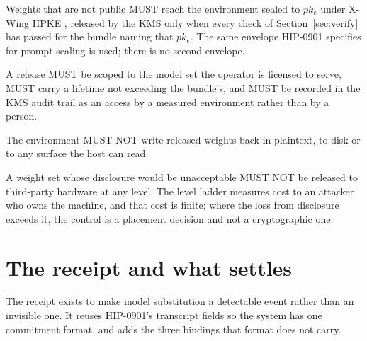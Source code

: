 \documentclass[11pt,a4paper]{article}
\newcommand{\req}[1]{\textbf{#1}}
\begin{document}
\begin{description}[leftmargin=1.6em]
\item[\req{K1}] Weights that are not public MUST reach the environment sealed to
$pk_e$ under X-Wing HPKE \cite{hpke}, released by the KMS \cite{hip0027} only when
every check of Section~\ref{sec:verify} has passed for the bundle naming that
$pk_e$. The same envelope HIP-0901 specifies for prompt sealing is used; there is
no second envelope.

\item[\req{K2}] A release MUST be scoped to the model set the operator is licensed
to serve, MUST carry a lifetime not exceeding the bundle's, and MUST be recorded in
the KMS audit trail as an access by a measured environment rather than by a person.

\item[\req{K3}] The environment MUST NOT write released weights back in plaintext,
to disk or to any surface the host can read.

\item[\req{K4}] A weight set whose disclosure would be unacceptable MUST NOT be
released to third-party hardware at any level. The level ladder measures cost to an
attacker who owns the machine, and that cost is finite; where the loss from
disclosure exceeds it, the control is a placement decision and not a cryptographic
one.
\end{description}

\section{The receipt and what settles}
\label{sec:receipt}

The receipt exists to make model substitution a detectable event rather than an
invisible one. It reuses HIP-0901's transcript fields so the system has one
commitment format, and adds the three bindings that format does not carry.
\end{document}
